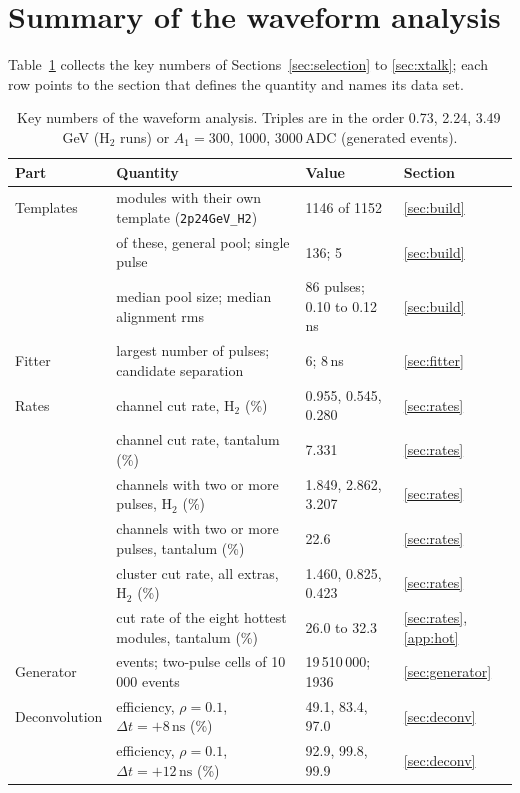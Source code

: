 \documentclass[11pt]{article}
\newcommand{\ns}{\,\mathrm{ns}}
\newcommand{\code}[1]{\texttt{#1}}
\begin{document}
\section{Summary of the waveform analysis}
\label{sec:summary}

Table~\ref{tab:summary} collects the key numbers of Sections~\ref{sec:selection} to \ref{sec:xtalk}; each row points to the section that defines the quantity and names its data set.

\begin{table}[htbp]
\centering
\caption{Key numbers of the waveform analysis. Triples are in the order 0.73, 2.24, 3.49\,GeV (H$_2$ runs) or $A_1 = 300$, 1000, 3000\,ADC (generated events).}
\label{tab:summary}
\small
\begin{tabular}{p{}p{}p{}l}
\toprule
Part & Quantity & Value & Section \\
\midrule
Templates & modules with their own template (\code{2p24GeV\_H2}) & 1146 of 1152 & \ref{sec:build} \\
 & of these, general pool; single pulse & 136; 5 & \ref{sec:build} \\
 & median pool size; median alignment rms & 86 pulses; 0.10 to 0.12\,ns & \ref{sec:build} \\
\midrule
Fitter & largest number of pulses; candidate separation & 6; 8\,ns & \ref{sec:fitter} \\
\midrule
Rates & channel cut rate, H$_2$ (\%) & 0.955, 0.545, 0.280 & \ref{sec:rates} \\
 & channel cut rate, tantalum (\%) & 7.331 & \ref{sec:rates} \\
 & channels with two or more pulses, H$_2$ (\%) & 1.849, 2.862, 3.207 & \ref{sec:rates} \\
 & channels with two or more pulses, tantalum (\%) & 22.6 & \ref{sec:rates} \\
 & cluster cut rate, all extras, H$_2$ (\%) & 1.460, 0.825, 0.423 & \ref{sec:rates} \\
 & cut rate of the eight hottest modules, tantalum (\%) & 26.0 to 32.3 & \ref{sec:rates}, \ref{app:hot} \\
\midrule
Generator & events; two-pulse cells of 10\,000 events & 19\,510\,000; 1936 & \ref{sec:generator} \\
\midrule
Deconvolution & efficiency, $\rho = 0.1$, $\Delta t = +8\ns$ (\%) & 49.1, 83.4, 97.0 & \ref{sec:deconv} \\
 & efficiency, $\rho = 0.1$, $\Delta t = +12\ns$ (\%) & 92.9, 99.8, 99.9 & \ref{sec:deconv} \\

\end{tabular}
\end{table}
\end{document}
